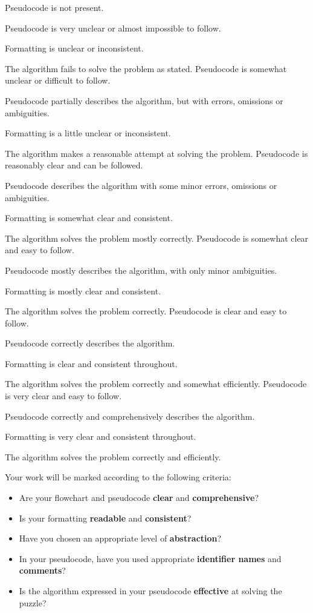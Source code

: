 \documentclass{../../../fal_assignment}
\begin{document}
\begin{markingrubric}
        \grade\fail Pseudocode is not present.
			\par Pseudocode is very unclear or almost impossible to follow.
			\par Formatting is unclear or inconsistent.
			\par The algorithm fails to solve the problem as stated.
        \grade Pseudocode is somewhat unclear or difficult to follow.
			\par Pseudocode partially describes the algorithm, but with errors, omissions or ambiguities.
			\par Formatting is a little unclear or inconsistent.
			\par The algorithm makes a reasonable attempt at solving the problem.
        \grade Pseudocode is reasonably clear and can be followed.
			\par Pseudocode describes the algorithm with some minor errors, omissions or ambiguities.
			\par Formatting is somewhat clear and consistent.
			\par The algorithm solves the problem mostly correctly.
        \grade Pseudocode is somewhat clear and easy to follow.
			\par Pseudocode mostly describes the algorithm, with only minor ambiguities.
			\par Formatting is mostly clear and consistent.
			\par The algorithm solves the problem correctly.
        \grade Pseudocode is clear and easy to follow.
			\par Pseudocode correctly describes the algorithm.
			\par Formatting is clear and consistent throughout.
			\par The algorithm solves the problem correctly and somewhat efficiently.
        \grade Pseudocode is very clear and easy to follow.
			\par Pseudocode correctly and comprehensively describes the algorithm.
			\par Formatting is very clear and consistent throughout.
			\par The algorithm solves the problem correctly and efficiently.
\end{markingrubric}

Your work will be marked according to the following criteria:
\begin{itemize}
	\item Are your flowchart and pseudocode \textbf{clear} and \textbf{comprehensive}?
	\item Is your formatting \textbf{readable} and \textbf{consistent}?
	\item Have you chosen an appropriate level of \textbf{abstraction}?
	\item In your pseudocode, have you used appropriate \textbf{identifier names} and \textbf{comments}?
	\item Is the algorithm expressed in your pseudocode \textbf{effective} at solving the puzzle?
\end{itemize}
\end{document}
